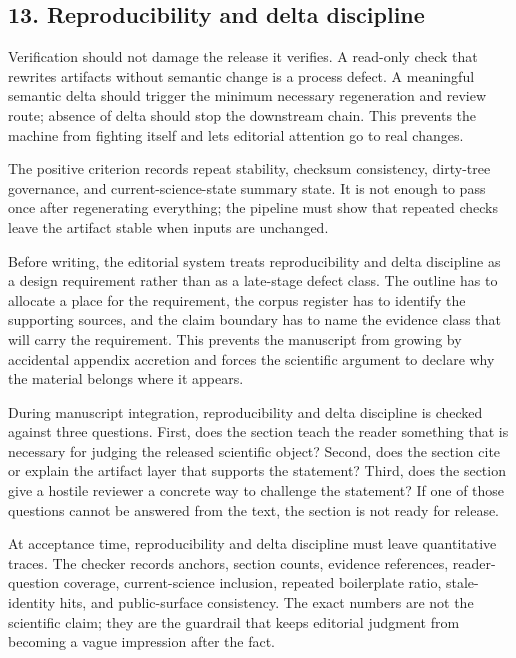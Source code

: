 \subsection{13. Reproducibility and delta discipline}

Verification should not damage the release it verifies. A read-only check that rewrites artifacts without semantic change is a process defect. A meaningful semantic delta should trigger the minimum necessary regeneration and review route; absence of delta should stop the downstream chain. This prevents the machine from fighting itself and lets editorial attention go to real changes.


The positive criterion records repeat stability, checksum consistency, dirty-tree governance, and current-science-state summary state. It is not enough to pass once after regenerating everything; the pipeline must show that repeated checks leave the artifact stable when inputs are unchanged.


Before writing, the editorial system treats reproducibility and delta discipline as a design requirement rather than as a late-stage defect class. The outline has to allocate a place for the requirement, the corpus register has to identify the supporting sources, and the claim boundary has to name the evidence class that will carry the requirement. This prevents the manuscript from growing by accidental appendix accretion and forces the scientific argument to declare why the material belongs where it appears.


During manuscript integration, reproducibility and delta discipline is checked against three questions. First, does the section teach the reader something that is necessary for judging the released scientific object? Second, does the section cite or explain the artifact layer that supports the statement? Third, does the section give a hostile reviewer a concrete way to challenge the statement? If one of those questions cannot be answered from the text, the section is not ready for release.


At acceptance time, reproducibility and delta discipline must leave quantitative traces. The checker records anchors, section counts, evidence references, reader-question coverage, current-science inclusion, repeated boilerplate ratio, stale-identity hits, and public-surface consistency. The exact numbers are not the scientific claim; they are the guardrail that keeps editorial judgment from becoming a vague impression after the fact.


